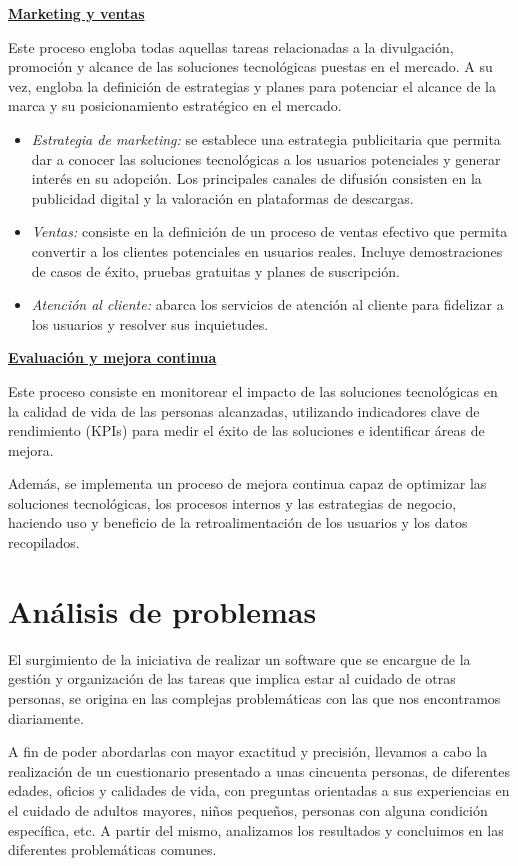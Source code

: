 \documentclass[a4paper,12pt]{article}
\begin{document}
    \par \noindent \textbf{\underline{Marketing y ventas}}
    \newline
    \par Este proceso engloba todas aquellas tareas relacionadas a la divulgación, promoción y alcance de las soluciones tecnológicas puestas en el mercado. A su vez, engloba la definición de estrategias y planes para potenciar el alcance de la marca y su posicionamiento estratégico en el mercado.
    \begin{itemize}
        \item[] \textit{Estrategia de marketing:} se establece una estrategia publicitaria que permita dar a conocer las soluciones tecnológicas a los usuarios potenciales y generar interés en su adopción. Los principales canales de difusión consisten en la publicidad digital y la valoración en plataformas de descargas.
        \item[] \textit{Ventas:} consiste en la definición de un proceso de ventas efectivo que permita convertir a los clientes potenciales en usuarios reales. Incluye demostraciones de casos de éxito, pruebas gratuitas y planes de suscripción.
        \item[] \textit{Atención al cliente:} abarca los servicios de atención al cliente para fidelizar a los usuarios y resolver sus inquietudes.
    \end{itemize}
    \par \noindent \textbf{\underline{Evaluación y mejora continua}}
    \newline
    \par Este proceso consiste en monitorear el impacto de las soluciones tecnológicas en la calidad de vida de las personas alcanzadas, utilizando indicadores clave de rendimiento (KPIs) para medir el éxito de las soluciones e identificar áreas de mejora.
    \par Además, se implementa un proceso de mejora continua capaz de optimizar las soluciones tecnológicas, los procesos internos y las estrategias de negocio, haciendo uso y beneficio de la retroalimentación de los usuarios y los datos recopilados.

    \newpage

    \section{Análisis de problemas}
    \par El surgimiento de la iniciativa de realizar un software que se encargue de la gestión y organización de las tareas que implica estar al cuidado de otras personas, se origina en las complejas problemáticas con las que nos encontramos diariamente.
    \par A fin de poder abordarlas con mayor exactitud y precisión, llevamos a cabo la realización de un cuestionario presentado a unas cincuenta personas, de diferentes edades, oficios y calidades de vida, con preguntas orientadas a sus experiencias en el cuidado de adultos mayores, niños pequeños, personas con alguna condición específica, etc. A partir del mismo, analizamos los resultados y concluimos en las diferentes problemáticas comunes.
    \newline
\end{document}
